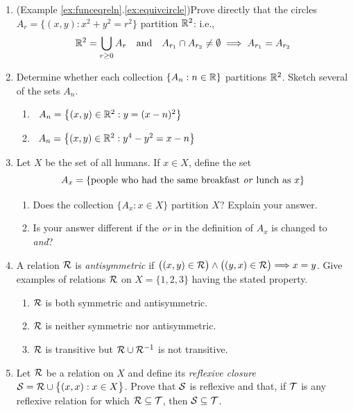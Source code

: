 \begin{exercises}{}{}
\begin{enumerate}
	
		\item (Example \ref*{ex:funceqreln}.\ref{ex:equivcircle})\lstsp Prove directly that the circles $A_r=\bigl\{(x,y):x^2+y^2=r^2\bigr\}$ partition $\mathbb{R}^2$: i.e.,
		\[
			\mathbb{R}^2=\bigcup_{r\ge 0}A_r \quad\text{and}\quad
			A_{r_1}\cap A_{r_2}\neq\emptyset \implies A_{r_1}=A_{r_2}
		\]
	
	
		\item Determine whether each collection $\{A_n:n\in\mathbb{R}\}$ partitions $\mathbb{R}^2$. Sketch several of the sets $A_n$.
		\begin{enumerate}
			\item {} \ $A_n=\big\{(x,y)\in\mathbb{R}^2:y=(x-n)^2\big\}$
			\setcounter{enumii}{2}
		  \item {} \ $A_n=\big\{(x,y)\in\mathbb{R}^2:y^4-y^2=x-n\big\}$
		\end{enumerate}
		
		
		\item Let $X$ be the set of all humans. If $x\in X$, define the set
		\[
			A_x=\{\text{people who had the same breakfast \emph{or} lunch as $x$}\}
		\]
		\begin{enumerate}
		  \item Does the collection $\{A_x:x\in X\}$ partition $X$? Explain your answer.
		  \item Is your answer different if the \emph{or} in the definition of $A_x$ is changed to \emph{and}?
		\end{enumerate}
		
		
	  \item\label{exs:anstisymm} A relation $\mathcal{R}$ is \emph{antisymmetric} if $\bigl((x,y)\in \mathcal{R}\bigr)\wedge\bigl((y,x)\in \mathcal{R}\bigr)\Longrightarrow x=y$. Give examples of relations $\mathcal{R}$ on $X=\{1,2,3\}$ having the stated property.
		\begin{enumerate}
			\item $\mathcal{R}$ is both symmetric and antisymmetric.
			\item $\mathcal{R}$ is neither symmetric nor antisymmetric.
			\item $\mathcal{R}$ is transitive but $\mathcal{R}\cup \mathcal{R}^{-1}$ is not transitive.
		\end{enumerate}
		
		
		\item Let $\mathcal{R}$ be a relation on $X$ and define its \emph{reflexive closure} $\mathcal{S}=\mathcal{R}\cup\bigl\{(x,x):x\in X\bigr\}$. Prove that $\mathcal{S}$ is reflexive and that, if $\mathcal{T}$ is any reflexive relation for which $\mathcal{R}\subseteq\mathcal{T}$, then $\mathcal{S}\subseteq\mathcal{T}$.
		

\end{enumerate}
\end{exercises}
